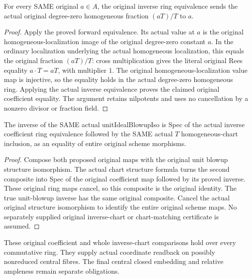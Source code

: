 \begin{lemma}
\label{lem:central-embedding-generic-unit-rees-inverse-generator}
\leanok
For every SAME original $a\in A$, the original inverse ring equivalence sends
the actual original degree-zero homogeneous fraction $(aT)/T$ to $a$.
\end{lemma}
\begin{proof}
Apply the proved forward equivalence. Its actual value at $a$ is the original
homogeneous-localization image of the original degree-zero constant $a$.
In the ordinary localization underlying the actual homogeneous localization,
this equals the original fraction $(aT)/T$: cross multiplication gives the
literal original Rees equality $a\cdot T=aT$, with multiplier $1$.
The original homogeneous-localization value map is injective, so the equality
holds in the actual degree-zero homogeneous ring. Applying the actual inverse
equivalence proves the claimed original coefficient equality. The argument
retains nilpotents and uses no cancellation by a nonzero divisor or fraction field.
\end{proof}

\begin{lemma}
\label{lem:central-embedding-generic-unit-rees-original-inverse-chart}
\leanok
The inverse of the SAME actual unitIdealBlowupIso is Spec of the actual inverse
coefficient ring equivalence followed by the SAME actual $T$ homogeneous-chart
inclusion, as an equality of entire original scheme morphisms.
\end{lemma}
\begin{proof}
Compose both proposed original maps with the original unit blowup structure
isomorphism. The actual chart structure formula turns the second composite
into Spec of the original coefficient map followed by its proved inverse.
These original ring maps cancel, so this composite is the original identity.
The true unit-blowup inverse has the same original composite. Cancel the actual
original structure isomorphism to identify the entire original scheme maps.
No separately supplied original inverse-chart or chart-matching certificate is assumed.
\end{proof}

These original coefficient and whole inverse-chart comparisons hold over every
commutative ring. They supply actual coordinate readback on possibly nonreduced
central fibres. The final central closed embedding and relative ampleness remain
separate obligations.

